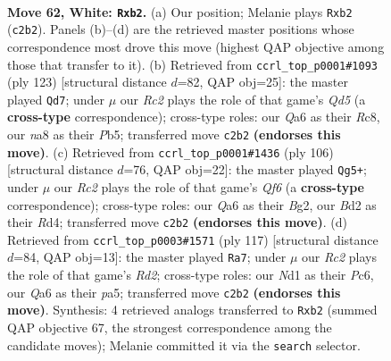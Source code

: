 \documentclass[11pt]{article}
\begin{document}
\clearpage

\begin{figure}[p]\centering
\begin{subfigure}{0.46\textwidth}\centering
\resizebox{\linewidth}{!}{%
\newchessgame
\chessboard[
  setfen={n7/3qbrk1/Q7/P1p2p1p/3p1Pp1/8/1rRBP2P/3N2K1 w - - 0 62},
  showmover=false,
  pgfstyle=straightmove, color=movearrow, markmove={c2-b2}
]}
\caption{}
\end{subfigure}\hfill
\begin{subfigure}{0.46\textwidth}\centering
\resizebox{\linewidth}{!}{%
\newchessgame
\chessboard[
  setfen={2r2k2/5pp1/5b1p/1p3P1P/1P1q4/P3RQPK/8/1B6 b - - 18 62},
  showmover=false,
  pgfstyle=straightmove, color=movearrow, markmove={d4-d7}
]}
\caption{}
\end{subfigure}
\\[4pt]
\begin{subfigure}{0.46\textwidth}\centering
\resizebox{\linewidth}{!}{%
\newchessgame
\chessboard[
  setfen={4r1k1/2p2p2/1p2bQ2/1q3p1p/3RP2P/6P1/6BK/8 w - - 0 54},
  showmover=false,
  pgfstyle=straightmove, color=movearrow, markmove={f6-g5}
]}
\caption{}
\end{subfigure}\hfill
\begin{subfigure}{0.46\textwidth}\centering
\resizebox{\linewidth}{!}{%
\newchessgame
\chessboard[
  setfen={q4bk1/3r1pp1/P1p1p2p/P3P3/2Q4P/3R2P1/1B3PK1/8 b - - 0 59},
  showmover=false,
  pgfstyle=straightmove, color=movearrow, markmove={d7-a7}
]}
\caption{}
\end{subfigure}
\caption{\textbf{Move 62, White: \texttt{Rxb2}.} (a) Our position; Melanie plays \texttt{Rxb2} (\texttt{c2b2}). Panels (b)--(d) are the retrieved master positions whose correspondence most drove this move (highest QAP objective among those that transfer to it). (b) Retrieved from \texttt{ccrl\_top\_p0001\#1093} (ply 123) [structural distance $d$=82, QAP obj=25]: the master played \texttt{Qd7}; under $\mu$ our \emph{Rc2} plays the role of that game's \emph{Qd5} (a \textbf{cross-type} correspondence); cross-type roles: our \emph{Q}a6 as their \emph{R}c8, our \emph{n}a8 as their \emph{P}b5; transferred move \texttt{c2b2} \textbf{(endorses this move)}. (c) Retrieved from \texttt{ccrl\_top\_p0001\#1436} (ply 106) [structural distance $d$=76, QAP obj=22]: the master played \texttt{Qg5+}; under $\mu$ our \emph{Rc2} plays the role of that game's \emph{Qf6} (a \textbf{cross-type} correspondence); cross-type roles: our \emph{Q}a6 as their \emph{B}g2, our \emph{B}d2 as their \emph{R}d4; transferred move \texttt{c2b2} \textbf{(endorses this move)}. (d) Retrieved from \texttt{ccrl\_top\_p0003\#1571} (ply 117) [structural distance $d$=84, QAP obj=13]: the master played \texttt{Ra7}; under $\mu$ our \emph{Rc2} plays the role of that game's \emph{Rd2}; cross-type roles: our \emph{N}d1 as their \emph{P}c6, our \emph{Q}a6 as their \emph{p}a5; transferred move \texttt{c2b2} \textbf{(endorses this move)}. Synthesis: 4 retrieved analogs transferred to \texttt{Rxb2} (summed QAP objective 67, the strongest correspondence among the candidate moves); Melanie committed it via the \texttt{search} selector.}
\label{fig:thought-m122}
\end{figure}
\end{document}
